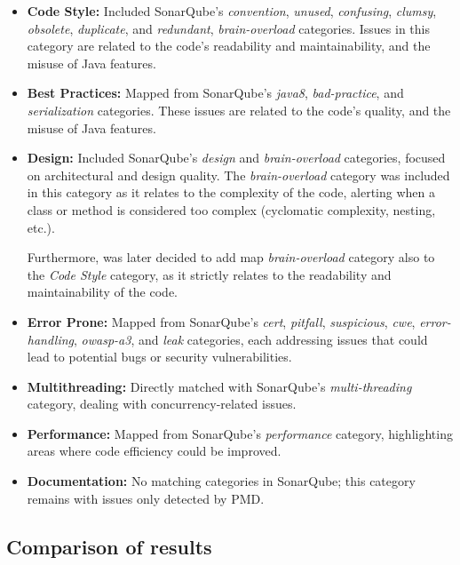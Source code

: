 \begin{itemize}
    \item \textbf{Code Style:} Included SonarQube's \textit{convention}, \textit{unused}, \textit{confusing}, \textit{clumsy}, \textit{obsolete}, \textit{duplicate}, and \textit{redundant}, \textit{brain-overload} categories. Issues in this category are related to the code's readability and maintainability, and the misuse of Java features.

    \item \textbf{Best Practices:} Mapped from SonarQube's \textit{java8}, \textit{bad-practice}, and \textit{serialization} categories. These issues are related to the code's quality, and the misuse of Java features.

    \item \textbf{Design:} Included SonarQube's \textit{design} and \textit{brain-overload} categories, focused on architectural and design quality. The \textit{brain-overload} category was included in this category as it relates to the complexity of the code, alerting when a class or method is considered too complex (cyclomatic complexity, nesting, etc.).

     Furthermore, was later decided to add map \textit{brain-overload} category also to the \textit{Code Style} category, as it strictly relates to the readability and maintainability of the code.

    \item \textbf{Error Prone:} Mapped from SonarQube's \textit{cert}, \textit{pitfall}, \textit{suspicious}, \textit{cwe}, \textit{error-handling}, \textit{owasp-a3}, and \textit{leak} categories, each addressing issues that could lead to potential bugs or security vulnerabilities.

    \item \textbf{Multithreading:} Directly matched with SonarQube's \textit{multi-threading} category, dealing with concurrency-related issues.

    \item \textbf{Performance:} Mapped from SonarQube's \textit{performance} category, highlighting areas where code efficiency could be improved.

    \item \textbf{Documentation:} No matching categories in SonarQube; this category remains with issues only detected by PMD.
\end{itemize}

\subsection{Comparison of results}

